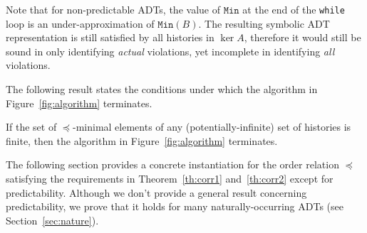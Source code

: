\begin{remark}
Note that for non-predictable ADTs, the value of $\texttt{Min}$ at the end of the \texttt{while} loop
is an under-approximation of $\texttt{Min}(B)$.
The resulting symbolic ADT representation is still satisfied by all histories in $\ker A$, therefore it would still be sound in only identifying
\emph{actual} violations, yet incomplete in identifying \emph{all} violations.
\end{remark}

The following result states the conditions under which the algorithm in Figure~\ref{fig:algorithm} terminates.

\begin{theorem}\label{th:corr2}
If the set of $\preceq$-minimal elements of any (potentially-infinite) set of histories is finite, then the algorithm in Figure~\ref{fig:algorithm} terminates.
\end{theorem}

The following section provides a concrete instantiation for the order relation $\preceq$ satisfying the requirements in
Theorem~\ref{th:corr1} and~\ref{th:corr2} except for predictability.
Although we don't provide a general result concerning predictability, we prove that it holds for many naturally-occurring ADTs (see Section~\ref{sec:nature}).
